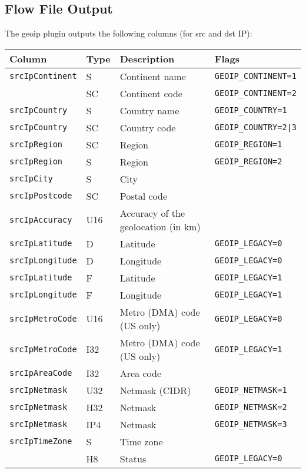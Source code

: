 \documentclass[documentation]{subfiles}
\begin{document}
\subsection{Flow File Output}
The geoip plugin outputs the following columns (for src and dst IP):
\begin{longtable}{llll}
    \toprule
    {\bf Column} & {\bf Type} & {\bf Description} & {\bf Flags}\\
    \midrule\endhead%
    {\tt srcIpContinent} & S & Continent name & {\tt GEOIP\_CONTINENT=1}\\
    {\tt \nameref{srcIpContinent}} & SC & Continent code & {\tt GEOIP\_CONTINENT=2}\\
    {\tt srcIpCountry} & S & Country name & {\tt GEOIP\_COUNTRY=1}\\
    {\tt srcIpCountry} & SC & Country code & {\tt GEOIP\_COUNTRY=2|3}\\
    {\tt srcIpRegion} & SC & Region & {\tt GEOIP\_REGION=1}\\
    {\tt srcIpRegion} & S & Region & {\tt GEOIP\_REGION=2}\\
    {\tt srcIpCity} & S & City &\\
    {\tt srcIpPostcode} & SC & Postal code &\\
    {\tt srcIpAccuracy} & U16 & Accuracy of the geolocation (in km)&\\
    {\tt srcIpLatitude} & D & Latitude & {\tt GEOIP\_LEGACY=0}\\
    {\tt srcIpLongitude} & D & Longitude & {\tt GEOIP\_LEGACY=0}\\
    {\tt srcIpLatitude} & F & Latitude & {\tt GEOIP\_LEGACY=1}\\
    {\tt srcIpLongitude} & F & Longitude & {\tt GEOIP\_LEGACY=1}\\
    {\tt srcIpMetroCode} & U16 & Metro (DMA) code (US only) & {\tt GEOIP\_LEGACY=0}\\
    {\tt srcIpMetroCode} & I32 & Metro (DMA) code (US only) & {\tt GEOIP\_LEGACY=1}\\
    {\tt srcIpAreaCode} & I32 & Area code &\\
    {\tt srcIpNetmask} & U32 & Netmask (CIDR) & {\tt GEOIP\_NETMASK=1}\\
    {\tt srcIpNetmask} & H32 & Netmask & {\tt GEOIP\_NETMASK=2}\\
    {\tt srcIpNetmask} & IP4 & Netmask & {\tt GEOIP\_NETMASK=3}\\
    {\tt srcIpTimeZone} & S & Time zone &\\
    {\tt \nameref{geoStat}} & H8 & Status & {\tt GEOIP\_LEGACY=0}\\
    \bottomrule
\end{longtable}
\end{document}
